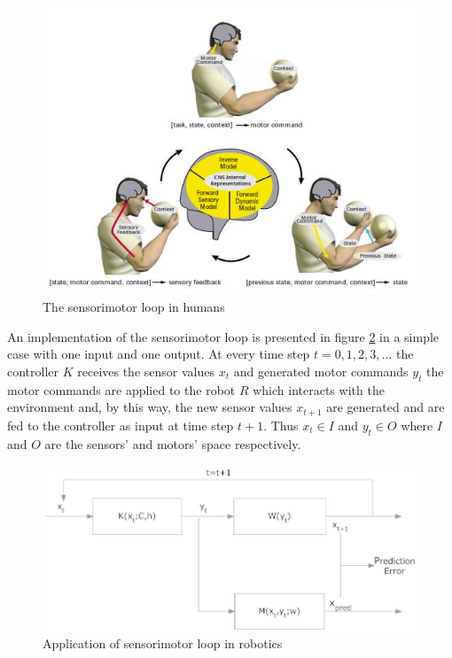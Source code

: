 \documentclass[msc,ai,logo]{infthesis}
\begin{document}
\begin{figure}[H]
\includegraphics[scale=0.7]{sensorimotor.jpg}
\centering
\caption{The sensorimotor loop in humans \citep{Wolpert2}}
\label{fig:sensorimotor}
\end{figure}
 
An implementation of the sensorimotor loop is presented in figure \ref{fig:snsRobot} in a simple case with one input and one output. At every time step $ t=0,1,2,3,... $ the controller $ K $ receives the sensor values $ x_{t}$ and generated motor commands $y_{t} $ the motor commands are applied to the robot $R $ which interacts with the environment and, by this way, the new sensor values $x_{t+1}$ are generated and are fed to the controller as input at time step $t+1$. Thus $x_{t} \in I $ and $y_{t} \in O$ where $I$ and $O$ are the sensors' and motors' space respectively.

\begin{figure}[H]
\includegraphics[scale=0.35]{sns.jpg}
\centering
\caption{Application of sensorimotor loop in robotics}
\label{fig:snsRobot}
\end{figure}
\end{document}
